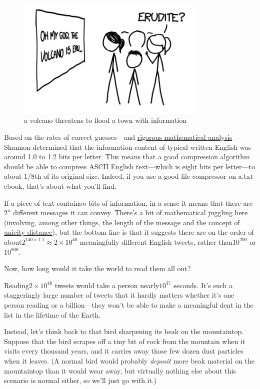 \begin{figure}[!htbp]
\centering
\includegraphics[scale=0.5, max width=0.8\textwidth]{imgs/a/34/twitter_volcano.png}
\caption{a volcano threatens to flood a town with information}
\end{figure}

{Based on the rates of correct guesses—and \href{http://languagelog.ldc.upenn.edu/myl/Shannon1950.pdf}{rigorous mathematical analysis} —Shannon determined that the information content of typical written English was around 1.0 to 1.2 bits per letter. This means that a good compression algorithm should be able to compress ASCII English text—which is eight bits per letter—to about 1/8th of its original size. Indeed, if you use a good file compressor on a.txt ebook, that’s about what you’ll find.}

{If a piece of text contains\emph{n} bits of information, in a sense it means that there are\( 2^n\) different messages it can convey. There’s a bit of mathematical juggling here (involving, among other things, the length of the message and the concept of \href{http://en.wikipedia.org/wiki/Unicity\_distance}{unicity distance}), but the bottom line is that it suggests there are on the order of about\( 2^{140\times1.1}\approx 2\times10^{46}\) meaningfully different English tweets, rather than\( 10^{200}\) or\( 10^{800}\).}

{Now, how long would it take the world to read them all out?}

{Reading\( 2\times10^{46}\) tweets would take a person nearly\( 10^{47}\) seconds. It’s such a staggeringly large number of tweets that it hardly matters whether it’s one person reading or a billion—they won’t be able to make a meaningful dent in the list in the lifetime of the Earth.}

{Instead, let’s think back to that bird sharpening its beak on the mountaintop. Suppose that the bird scrapes off a tiny bit of rock from the mountain when it visits every thousand years, and it carries away those few dozen dust particles when it leaves. (A normal bird would probably \emph{deposit} more beak material on the mountaintop than it would wear away, but virtually nothing else about this scenario is normal either, so we’ll just go with it.)}

